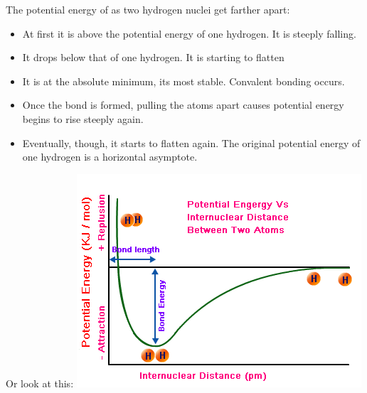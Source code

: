 \documentclass[a4paper, 8pt]{memoir}
\begin{document}
The potential energy of as two hydrogen nuclei get farther apart:
\begin{itemize}
\item At first it is above the potential energy of one hydrogen. It is steeply falling.
\item It drops below that of one hydrogen. It is starting to flatten
\item It is at the absolute minimum, its most stable. Convalent bonding occurs.
\item Once the bond is formed, pulling the atoms apart causes potential energy begins to rise steeply again.
\item Eventually, though, it starts to flatten again. The original potential energy of one hydrogen is a horizontal asymptote.
\end{itemize}

Or look at this: 
\includegraphics[scale=0.4]{pe-h2}
\end{document}
